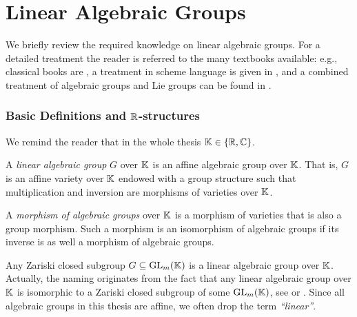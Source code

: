 


\section{Linear Algebraic Groups} \label{sec:LinearAlgebraicGroups}

We briefly review the required knowledge on linear algebraic groups. For a detailed treatment the reader is referred to the many textbooks available: e.g., classical books are \cite{BorelBook, Humphreys, SpringerBook}, a treatment in scheme language is given in \cite{MilneBook, WaterhouseBook}, and a combined treatment of algebraic groups and Lie groups can be found in \cite{borel2006lie, GoodmanWallachBook, OnishchikVinbergBook, ProcesiBook}.

\subsubsection{Basic Definitions and $\mathbb R$-structures}

We remind the reader that in the whole thesis $\mathbb K \in \{ \mathbb R, \mathbb C\}$.

\begin{defn}\label{defn:LinearAlgebraicGroup}
	A \emph{linear algebraic group} $G$ over $\mathbb K$ is an affine algebraic group over $\mathbb K$. That is, $G$ is an affine variety over $\mathbb K$ endowed with a group structure such that multiplication and inversion are morphisms of varieties over $\mathbb K$.
	\hfill{}
\end{defn}

A \emph{morphism of algebraic groups} over $\mathbb K$ is a morphism of varieties that is also a group morphism. Such a morphism is an isomorphism of algebraic groups if its inverse is as well a morphism of algebraic groups.

Any Zariski closed subgroup $G \subseteq \operatorname{GL}_m(\mathbb K)$ is a linear algebraic group over $\mathbb K$. Actually, the naming originates from the fact that any linear algebraic group over $\mathbb K$ is isomorphic to a Zariski closed subgroup of some $\operatorname{GL}_m(\mathbb K)$, see \cite[Proposition~1.10]{BorelBook} or \cite[Theorem in §3.4]{WaterhouseBook}.
Since all algebraic groups in this thesis are affine, we often drop the term \emph{``linear''}.

